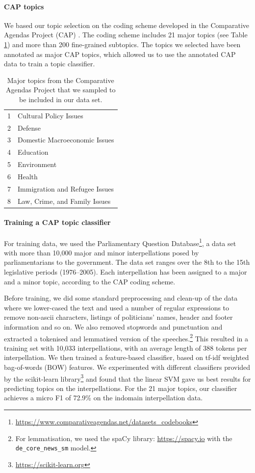 \documentclass[letterpaper, 10 pt, conference]{ieeeconf}  %
\begin{document}
\paragraph{CAP topics}
We based our topic selection on the coding scheme developed in the Comparative Agendas Project (CAP) \cite{bevan:2019}. 
The coding scheme includes 21 major topics (see Table \ref{tab:cap}) and more than 200 fine-grained subtopics. The topics we selected have been annotated as major CAP topics, which allowed us to use the annotated CAP data to train a topic classifier.

\begin{table}[t]
\begin{center}\small
\begin{tabular}{ll}
\hline
1 & Cultural Policy Issues \\
2 & Defense \\
3 & Domestic Macroeconomic Issues \\
4 & Education \\
5 & Environment \\
6 & Health  \\
7 & Immigration and Refugee Issues \\
8 & Law, Crime, and Family Issues  \\
\hline
\end{tabular}
\end{center}
\caption{Major topics from the Comparative Agendas Project that we sampled to be included in our data set.}\label{tab:cap} 
\end{table}

\paragraph{Training a CAP topic classifier}
For training data, we used the Parliamentary Question Database\footnote{\url{https://www.comparativeagendas.net/datasets_codebooks}}, a data set with more than 10,000 major and minor interpellations posed by parliamentarians to the government. 
The data set ranges over the 8th to the 15th legislative periods (1976--2005). Each interpellation has been assigned to a major and a minor topic, according to the CAP coding scheme.

Before training, we did some standard preprocessing and clean-up of the data where we lower-cased the text and used a number of regular expressions to remove non-ascii characters, listings of politicians' names, header and footer information and so on. We also removed stopwords and punctuation and extracted a tokenised and lemmatised version of the speeches.\footnote{For lemmatisation, we used the spaCy library: \url{https://spacy.io} with the \texttt{de\_core\_news\_sm} model.} 
This resulted in a training set with 10,033 interpellations, with an average length of 388 tokens per interpellation. 
We then trained a feature-based classifier, based on tf-idf weighted bag-of-words (BOW) features. We experimented with different classifiers provided by the scikit-learn library\footnote{\url{https://scikit-learn.org}} and found that the linear SVM gave us best results for predicting topics on the interpellations. 
For the 21 major topics, our classifier achieves a micro F1 of 72.9\% on the indomain interpellation data.
\end{document}
